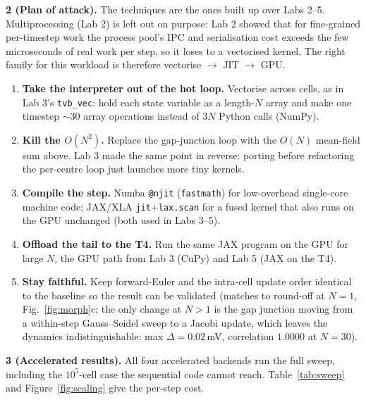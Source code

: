 \documentclass[11pt,a4paper]{article}
\newcommand{\Qpart}[1]{\textbf{#1.}}
\begin{document}
\Qpart{2 (Plan of attack)}
The techniques are the ones built up over Labs 2--5. Multiprocessing (Lab 2) is left out on purpose: Lab 2 showed that for fine-grained per-timestep work the process pool's IPC and serialisation cost exceeds the few microseconds of real work per step, so it loses to a vectorised kernel. The right family for this workload is therefore vectorise $\to$ JIT $\to$ GPU.
\begin{enumerate}\setlength\itemsep{0.1em}
    \item \textbf{Take the interpreter out of the hot loop.} Vectorise across cells, as in Lab 3's \texttt{tvb\_vec}: hold each state variable as a length-$N$ array and make one timestep $\sim$30 array operations instead of $3N$ Python calls (NumPy).
    \item \textbf{Kill the $O(N^2)$.} Replace the gap-junction loop with the $O(N)$ mean-field sum above. Lab 3 made the same point in reverse: porting before refactoring the per-centre loop just launches more tiny kernels.
    \item \textbf{Compile the step.} Numba \texttt{@njit} (\texttt{fastmath}) for low-overhead single-core machine code; JAX/XLA \texttt{jit}+\texttt{lax.scan} for a fused kernel that also runs on the GPU unchanged (both used in Labs 3--5).
    \item \textbf{Offload the tail to the T4.} Run the same JAX program on the GPU for large $N$, the GPU path from Lab 3 (CuPy) and Lab 5 (JAX on the T4).
    \item \textbf{Stay faithful.} Keep forward-Euler and the intra-cell update order identical to the baseline so the result can be validated (matches to round-off at $N=1$, Fig.~\ref{fig:morph}c; the only change at $N>1$ is the gap junction moving from a within-step Gauss--Seidel sweep to a Jacobi update, which leaves the dynamics indistinguishable: max $\Delta=0.02$\,mV, correlation $1.0000$ at $N=30$).
\end{enumerate}

\Qpart{3 (Accelerated results)}
All four accelerated backends run the full sweep, including the $10^5$-cell case the sequential code cannot reach. Table~\ref{tab:sweep} and Figure~\ref{fig:scaling} give the per-step cost.
\end{document}
